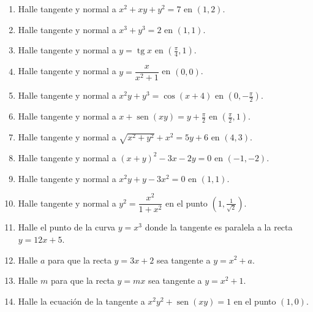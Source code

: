 \documentclass[12pt, letterpaper]{article}
\begin{document}
\begin{enumerate}[leftmargin=*]
  \item \dificil{} Halle tangente y normal a $x^2 + xy + y^2 = 7$ en $(1, 2)$.

  \item \dificil{} Halle tangente y normal a $x^3 + y^3 = 2$ en $(1, 1)$.

  \item \dificil{} Halle tangente y normal a $y = \operatorname{tg} x$ en $\left(\frac{\pi}{4}, 1\right)$.

  \item \dificil{} Halle tangente y normal a $y = \dfrac{x}{x^2 + 1}$ en $(0, 0)$.

  \item \dificil{} Halle tangente y normal a $x^2 y + y^3 = \cos(x+4)$ en $\left(0, -\frac{\pi}{2}\right)$. %

  \item \dificil{} Halle tangente y normal a $x + \operatorname{sen}(xy) = y + \frac{\pi}{2}$ en $\left(\frac{\pi}{2}, 1\right)$. %

  \item \muyDificil{} Halle tangente y normal a $\sqrt{x^2+y^2} + x^2 = 5y + 6$ en $(4,3)$. %

  \item \muyDificil{} Halle tangente y normal a $(x+y)^2 - 3x - 2y = 0$ en $(-1,-2)$. %

  \item \muyDificil{} Halle tangente y normal a $x^2 y + y - 3x^2 = 0$ en $(1, 1)$.

  \item \muyDificil{} Halle tangente y normal a $y^2 = \dfrac{x^2}{1 + x^2}$ en el punto $(1, \frac{1}{\sqrt{2}})$.

  \item \muyDificil{} Halle el punto de la curva $y = x^3$ donde la tangente es paralela a la recta $y = 12x + 5$.

  \item \muyDificil{} Halle $a$ para que la recta $y = 3x + 2$ sea tangente a $y = x^2 + a$.

  \item \muyDificil{} Halle $m$ para que la recta $y = mx$ sea tangente a $y = x^2 + 1$.

  \item \muyDificil{} Halle la ecuación de la tangente a $x^2 y^2 + \operatorname{sen}(xy) = 1$ en el punto $(1, 0)$.

\end{enumerate}
\end{document}
